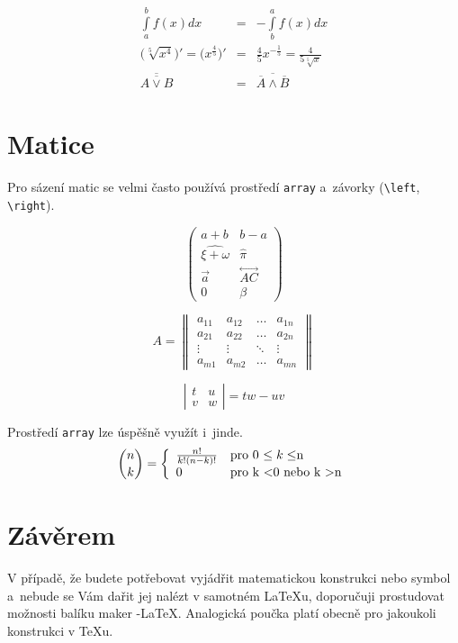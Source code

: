 \documentclass[a4paper,twocolumn,11pt]{article}
\theoremstyle{definition}
\theoremstyle{plain}
\begin{document}
\begin{eqnarray}
	\int\limits_a^b f(x)dx & = & -\int\limits_b^a f(x)dx \\
	\Big(\sqrt[5]{x^4}\Big)' = \Big(x^{\frac{4}{5}}\Big)' & = & \frac{4}{5}x^{-\frac{1}{5}} = \frac{4}{5\sqrt[5]{x}} \\
	\overline{\overline{A \vee B}}  & = & \overline{\overline{A} \wedge \overline{B}}
\end{eqnarray}

\section{Matice}

Pro sázení matic se velmi často používá prostředí \texttt{array} a~závorky (\verb|\left|, \verb|\right|). 

$$	\left(
	\begin{array}{cc}
	a + b & b-a \\
	\widehat{\xi + \omega} & \hat{\pi}\\
	\vec{a} & \overset\longleftrightarrow{AC} \\
	0 & \beta
	\end{array} \right)
 $$

$$
	A = \left\| 
	\begin{array}{cccc}
	a_{11} & a_{12} & \ldots & a_{1n} \\
	a_{21} & a_{22} & \ldots & a_{2n} \\
	\vdots & \vdots & \ddots & \vdots \\
	a_{m1} & a_{m2} & \ldots & a_{mn}
	\end{array} 	
	\right\|
$$

$$
	\left|
	\begin{array}{lr}
		t & u \\
		v & w
	\end{array}
	\right|	= tw - uv	
$$

Prostředí \texttt{array} lze úspěšně využít i~jinde.
$$  \binom nk =  \left\{
	\begin{array}{ll}
		\frac{n!}{k!(n-k)!} & \text{pro 0 $\leq k \leq $n}	\\
		0 & \text{pro k \textless 0  \mbox{nebo} k \textgreater n}	
	\end{array} \right. 	$$
	
\section{Závěrem}

V případě, že budete potřebovat vyjádřit matematickou konstrukci nebo symbol a~nebude se Vám dařit jej nalézt v samotném \LaTeX u, doporučuji prostudovat možnosti balíku maker \AmS-\LaTeX.
Analogická poučka platí obecně pro jakoukoli konstrukci v \TeX u.
\end{document}
